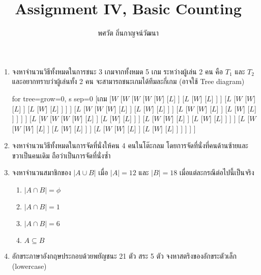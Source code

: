 \documentclass{article}
\title{Assignment IV, Basic Counting}
\author{พศวัต ถิ่นกาญจน์วัฒนา}
\date{}
\begin{document}
\maketitle
\flushleft
\renewcommand{\labelenumii}{\arabic{enumii})}

\begin{enumerate}
	\item จงหาจำนวนวิธีทั้งหมดในการชนะ 3 เกมจากทั้งหมด 5 เกม ระหว่างผู้เล่น 2 คน คือ $T_1$ และ $T_2$\newline
	และอยากทราบว่าผู้เล่นทั้ง 2 คน จะสามารถชนะเกมได้ทีมละกี่เกม (อาจใช้ Tree diagram)\newline
	\begin{forest}
	for tree={grow=0, s sep=0}
		[เกม
			[$W$
				[$W$
					[$W$
						[$W$
							[$W$]
							[$L$]
						]
						[$L$
							[$W$]
							[$L$]
						]
					]
					[$L$
						[$W$
							[$W$]
							[$L$]
						]
						[$L$
							[$W$]
							[$L$]
						]
					]
				]
				[$L$
					[$W$
						[$W$
							[$W$]
							[$L$]
						]
						[$L$
							[$W$]
							[$L$]
						]
					]
					[$L$
						[$W$
							[$W$]
							[$L$]
						]
						[$L$
							[$W$]
							[$L$]
						]
					]
				]
			]
			[$L$
				[$W$
					[$W$
						[$W$
							[$W$]
							[$L$]
						]
						[$L$
							[$W$]
							[$L$]
						]
					]
					[$L$
						[$W$
							[$W$]
							[$L$]
						]
						[$L$
							[$W$]
							[$L$]
						]
					]
				]
				[$L$
					[$W$
						[$W$
							[$W$]
							[$L$]
						]
						[$L$
							[$W$]
							[$L$]
						]
					]
					[$L$
						[$W$
							[$W$]
							[$L$]
						]
						[$L$
							[$W$]
							[$L$]
						]
					]
				]
			]
		]
	\end{forest}
	\item จงหาจำนวนวิธีทั้งหมดในการจัดที่นั่งให้คน 4 คนในโต๊ะกลม โดยการจัดที่นั่งที่คนด้านซ้ายและขวาเป็นคนเดิม\newline
	ถือว่าเป็นการจัดที่นั่งซ้ำ
	\item จงหาจำนวนสมาชิกของ $|A \cup B|$ เมื่อ $|A| = 12$ และ $|B| = 18$ เมื่อแต่ละกรณีต่อไปนี้เป็นจริง
	\begin{enumerate}
		\item $|A \cap B| = \phi$
		\item $|A \cap B| = 1$
		\item $|A \cap B| = 6$
		\item $A \subseteq B$
	\end{enumerate}
	\item อักขระภาษาอังกฤษประกอบด้วยพยัญชนะ 21 ตัว สระ 5 ตัว จงหาสตริงของอักขระตัวเล็ก (lowercase)\newline

\end{enumerate}
\end{document}
